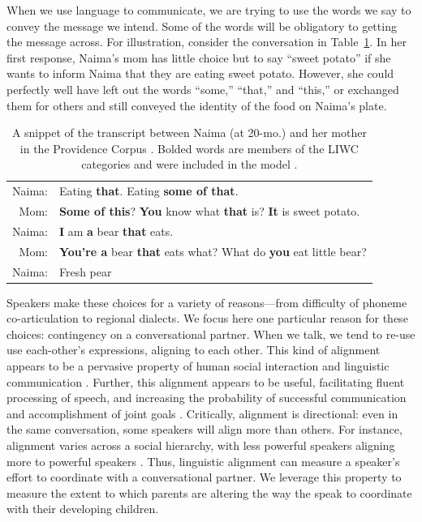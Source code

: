 \documentclass[10pt,letterpaper]{article}
\begin{document}
When we use language to communicate, we are trying to use the words we say to convey the message we intend. Some of the words will be obligatory to getting the message across. For illustration, consider the conversation in Table~\ref{tab:naima}. In her first response, Naima's mom has little choice but to say ``sweet potato'' if she wants to inform Naima that they are eating sweet potato. However, she could perfectly well have left out the words ``some,'' ``that,'' and ``this,'' or exchanged them for others and still conveyed the identity of the food on Naima's plate.  

\begin{table}[tb]
\begin{tabular}{r p{}}
\hline
Naima: & Eating \textbf{that}. Eating \textbf{some of that}.\\

Mom: & \textbf{Some of this}? \textbf{You} know what \textbf{that} is? \textbf{It} is sweet potato.\\

Naima: & \textbf{I} am \textbf{a} bear \textbf{that} eats.\\

Mom: & \textbf{You're a} bear \textbf{that} eats what? What do \textbf{you} eat little bear?\\

Naima: & Fresh pear\\
\hline
\end{tabular}
\caption{\label{tab:naima}A snippet of the transcript between Naima (at 20-mo.) and her mother in the Providence Corpus \cite{demuth2006}. Bolded words are members of the LIWC categories and were included in the model \cite{pennebaker2007}. }
\end{table}

Speakers make these choices for a variety of reasons---from difficulty of phoneme co-articulation to regional dialects. We focus here one particular reason for these choices: contingency on a conversational partner. When we talk, we tend to re-use use each-other's expressions, aligning to each other. This kind of alignment appears to be a pervasive property of human social interaction and linguistic communication \cite{giles1991, garrod2004}. Further, this alignment appears to be useful, facilitating fluent processing of speech, and increasing the probability of successful communication and accomplishment of joint goals \cite{ireland2011, fusaroli2012}. Critically, alignment is directional: even in the same conversation, some speakers will align more than others. For instance, alignment varies across a social hierarchy, with less powerful speakers aligning more to powerful speakers \cite{kacewicz2013}. Thus, linguistic alignment can measure a speaker's effort to  coordinate with a conversational partner. We leverage this property to measure the extent to which parents are altering the way the speak to coordinate with their developing children.
\end{document}
